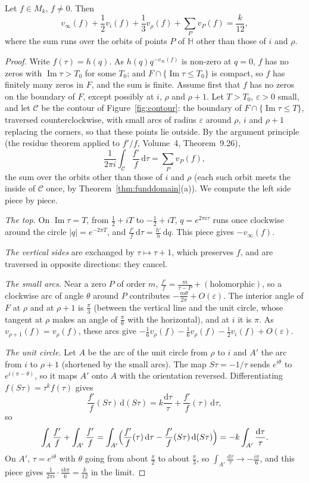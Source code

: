 \begin{theorem}\label{thm:valence}
Let $f\in M_k$, $f\ne0$. Then
\[
v_\infty(f)+\frac12v_i(f)+\frac13v_\rho(f)+\sum_Pv_P(f)=\frac k{12},
\]
where the sum runs over the orbits of points $P$ of $\mathbb H$ other than those of $i$ and $\rho$.
\end{theorem}
\begin{proof}
Write $f(\tau)=h(q)$. As $h(q)q^{-v_\infty(f)}$ is non-zero at $q=0$, $f$ has no zeros with $\operatorname{Im}\tau>T_0$ for some $T_0$; and $F\cap\{\operatorname{Im}\tau\le T_0\}$ is
compact, so $f$ has finitely many zeros in $F$, and the sum is finite. Assume first that $f$ has no zeros on the boundary of $F$, except possibly at $i$, $\rho$ and
$\rho+1$. Let $T>T_0$, $\varepsilon>0$ small, and let $\mathcal C$ be the contour of Figure~\ref{fig:contour}: the boundary of $F\cap\{\operatorname{Im}\tau\le T\}$,
traversed counterclockwise, with small arcs of radius $\varepsilon$ around $\rho$, $i$ and $\rho+1$ replacing the corners, so that these points lie outside. By the
argument principle (the residue theorem applied to $f'/f$, Volume~4, Theorem~9.26),
\[
\frac1{2\pi i}\int_{\mathcal C}\frac{f'}f\,\mathrm d\tau=\sum_Pv_P(f),
\]
the sum over the orbits other than those of $i$ and $\rho$ (each such orbit meets the inside of $\mathcal C$ once, by Theorem~\ref{thm:funddomain}(a)). We compute the
left side piece by piece.

\emph{The top.} On $\operatorname{Im}\tau=T$, from $\frac12+iT$ to $-\frac12+iT$, $q=e^{2\pi i\tau}$ runs once clockwise around the circle $|q|=e^{-2\pi T}$, and
$\frac{f'}f\,\mathrm d\tau=\frac{h'}h\,\mathrm dq$. This piece gives $-v_\infty(f)$.

\emph{The vertical sides} are exchanged by $\tau\mapsto\tau+1$, which preserves $f$, and are traversed in opposite directions: they cancel.

\emph{The small arcs.} Near a zero $P$ of order $m$, $\frac{f'}f=\frac m{\tau-P}+(\text{holomorphic})$, so a clockwise arc of angle $\theta$ around $P$ contributes
$-\frac{m\theta}{2\pi}+O(\varepsilon)$. The interior angle of $F$ at $\rho$ and at $\rho+1$ is $\frac\pi3$ (between the vertical line and the unit circle, whose tangent at
$\rho$ makes an angle of $\frac\pi6$ with the horizontal), and at $i$ it is $\pi$. As $v_{\rho+1}(f)=v_\rho(f)$, these arcs give
$-\frac16v_\rho(f)-\frac16v_\rho(f)-\frac12v_i(f)+O(\varepsilon)$.

\emph{The unit circle.} Let $A$ be the arc of the unit circle from $\rho$ to $i$ and $A'$ the arc from $i$ to $\rho+1$ (shortened by the small arcs). The map
$S\tau=-1/\tau$ sends $e^{i\theta}$ to $e^{i(\pi-\theta)}$, so it maps $A'$ onto $A$ with the orientation reversed. Differentiating $f(S\tau)=\tau^kf(\tau)$ gives
\[
\frac{f'}f(S\tau)\,\mathrm d(S\tau)=k\frac{\mathrm d\tau}\tau+\frac{f'}f(\tau)\,\mathrm d\tau,
\]
so
\[
\int_A\frac{f'}f+\int_{A'}\frac{f'}f=\int_{A'}\Bigl(\frac{f'}f(\tau)\,\mathrm d\tau-\frac{f'}f(S\tau)\,\mathrm d(S\tau)\Bigr)=-k\int_{A'}\frac{\mathrm d\tau}\tau.
\]
On $A'$, $\tau=e^{i\theta}$ with $\theta$ going from about $\frac\pi2$ to about $\frac\pi3$, so $\int_{A'}\frac{\mathrm d\tau}\tau\to-\frac{i\pi}6$, and this piece gives
$\frac1{2\pi i}\cdot\frac{ik\pi}6=\frac k{12}$ in the limit.


\end{proof}
